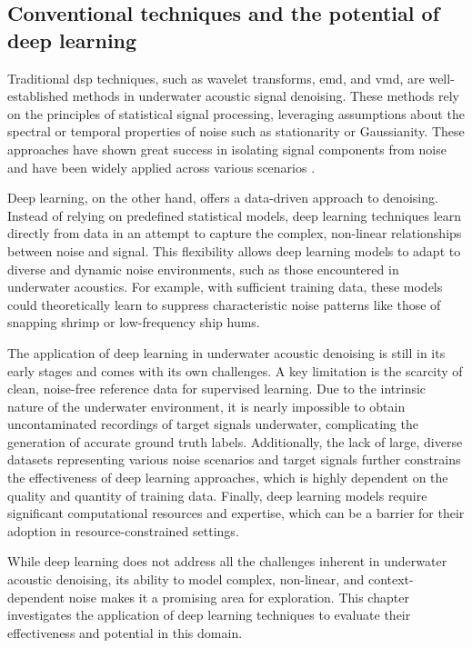 \subsection{Conventional techniques and the potential of deep learning}

Traditional \acrlong{dsp} techniques, such as wavelet transforms, \acrlong{emd}, and \acrlong{vmd}, are well-established methods in underwater acoustic signal denoising. These methods rely on the principles of statistical signal processing, leveraging assumptions about the spectral or temporal properties of noise such as stationarity or Gaussianity. These approaches have shown great success in isolating signal components from noise and have been widely applied across various scenarios \cite{khan_new_2015, li_new_2024, li_noise_2024, li_ultrasound_2024, li_research_2023, yang_dual_2023, li_research_2022, yang_denoising_2021}.

Deep learning, on the other hand, offers a data-driven approach to denoising. Instead of relying on predefined statistical models, deep learning techniques learn directly from data in an attempt to capture the complex, non-linear relationships between noise and signal. This flexibility allows deep learning models to adapt to diverse and dynamic noise environments, such as those encountered in underwater acoustics. For example, with sufficient training data, these models could theoretically learn to suppress characteristic noise patterns like those of snapping shrimp or low-frequency ship hums.

The application of deep learning in underwater acoustic denoising is still in its early stages and comes with its own challenges. A key limitation is the scarcity of clean, noise-free reference data for supervised learning. Due to the intrinsic nature of the underwater environment, it is nearly impossible to obtain uncontaminated recordings of target signals underwater, complicating the generation of accurate ground truth labels. Additionally, the lack of large, diverse datasets representing various noise scenarios and target signals further constrains the effectiveness of deep learning approaches, which is highly dependent on the quality and quantity of training data. Finally, deep learning models require significant computational resources and expertise, which can be a barrier for their adoption in resource-constrained settings. 

While deep learning does not address all the challenges inherent in underwater acoustic denoising, its ability to model complex, non-linear, and context-dependent noise makes it a promising area for exploration. This chapter investigates the application of deep learning techniques to evaluate their effectiveness and potential in this domain.

